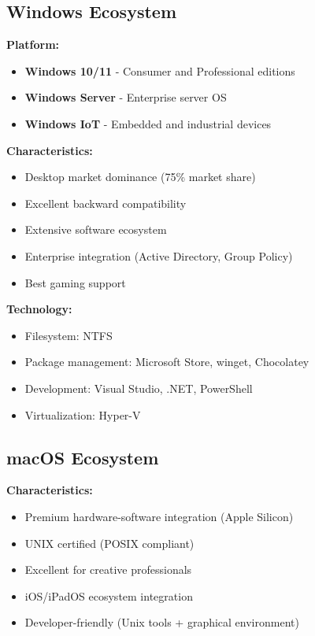 \subsection{Windows Ecosystem}

\textbf{Platform:}
\begin{itemize}
    \item \textbf{Windows 10/11} - Consumer and Professional editions
    \item \textbf{Windows Server} - Enterprise server OS
    \item \textbf{Windows IoT} - Embedded and industrial devices
\end{itemize}

\textbf{Characteristics:}
\begin{itemize}
    \item Desktop market dominance (75\% market share)
    \item Excellent backward compatibility
    \item Extensive software ecosystem
    \item Enterprise integration (Active Directory, Group Policy)
    \item Best gaming support
\end{itemize}

\textbf{Technology:}
\begin{itemize}
    \item Filesystem: NTFS
    \item Package management: Microsoft Store, winget, Chocolatey
    \item Development: Visual Studio, .NET, PowerShell
    \item Virtualization: Hyper-V
\end{itemize}

\subsection{macOS Ecosystem}

\textbf{Characteristics:}
\begin{itemize}
    \item Premium hardware-software integration (Apple Silicon)
    \item UNIX certified (POSIX compliant)
    \item Excellent for creative professionals
    \item iOS/iPadOS ecosystem integration
    \item Developer-friendly (Unix tools + graphical environment)
\end{itemize}

